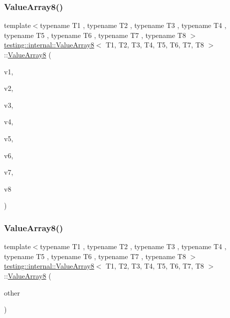 \subsubsection{\texorpdfstring{ValueArray8()}{ValueArray8()}\hspace{0.1cm}{\footnotesize\ttfamily [1/2]}}
{\footnotesize\ttfamily template$<$typename T1 , typename T2 , typename T3 , typename T4 , typename T5 , typename T6 , typename T7 , typename T8 $>$ \\
\mbox{\hyperlink{classtesting_1_1internal_1_1_value_array8}{testing\+::internal\+::\+Value\+Array8}}$<$ T1, T2, T3, T4, T5, T6, T7, T8 $>$\+::\mbox{\hyperlink{classtesting_1_1internal_1_1_value_array8}{Value\+Array8}} (\begin{DoxyParamCaption}\item[{T1}]{v1,  }\item[{T2}]{v2,  }\item[{T3}]{v3,  }\item[{T4}]{v4,  }\item[{T5}]{v5,  }\item[{T6}]{v6,  }\item[{T7}]{v7,  }\item[{T8}]{v8 }\end{DoxyParamCaption})\hspace{0.3cm}{\ttfamily [inline]}}

\mbox{\label{classtesting_1_1internal_1_1_value_array8_aa2d57c811dc60c02a487c36b4b6b4464}} 
\subsubsection{\texorpdfstring{ValueArray8()}{ValueArray8()}\hspace{0.1cm}{\footnotesize\ttfamily [2/2]}}
{\footnotesize\ttfamily template$<$typename T1 , typename T2 , typename T3 , typename T4 , typename T5 , typename T6 , typename T7 , typename T8 $>$ \\
\mbox{\hyperlink{classtesting_1_1internal_1_1_value_array8}{testing\+::internal\+::\+Value\+Array8}}$<$ T1, T2, T3, T4, T5, T6, T7, T8 $>$\+::\mbox{\hyperlink{classtesting_1_1internal_1_1_value_array8}{Value\+Array8}} (\begin{DoxyParamCaption}\item[{const \mbox{\hyperlink{classtesting_1_1internal_1_1_value_array8}{Value\+Array8}}$<$ T1, T2, T3, T4, T5, T6, T7, T8 $>$ \&}]{other }\end{DoxyParamCaption})\hspace{0.3cm}{\ttfamily [inline]}}



